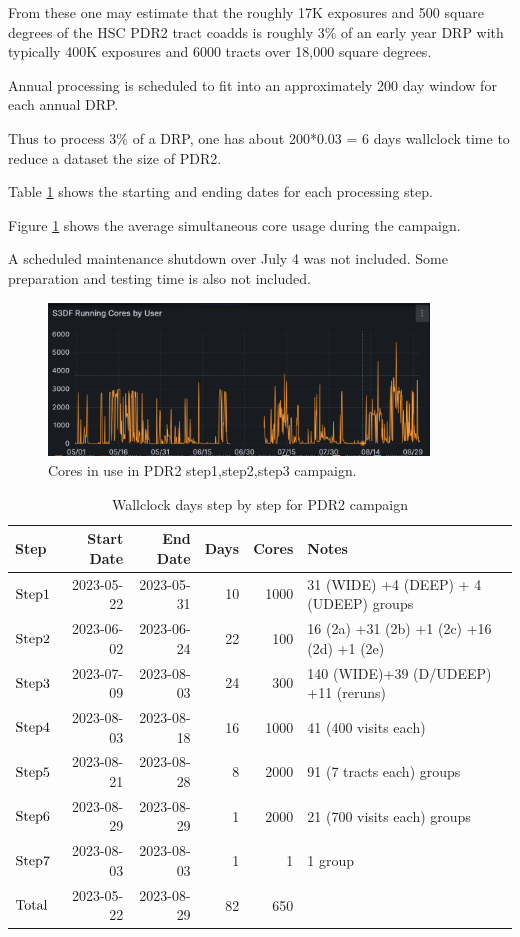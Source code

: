 From these one may estimate that the roughly 17K exposures and 500 
square degrees of the HSC PDR2 tract coadds is roughly 3\% of an 
early year DRP with typically 400K exposures and 6000 tracts 
over 18,000 square degrees.

Annual processing is scheduled to fit into an approximately 200 day window
for each annual DRP.

Thus to process 3\% of a DRP, one has about 200*0.03 = 6 days wallclock time
to reduce a dataset the size of PDR2.

Table \ref{tab:days} shows the 
starting and ending dates for each processing step.

Figure \ref{fig:cores} shows the average simultaneous core usage during the campaign.

A scheduled maintenance shutdown over July 4 was not included.  Some
preparation and testing time is also not included. 

\begin{figure}[hbt!]
\includegraphics[width=0.9\textwidth]{campaignCores.png}
\caption{Cores in use in PDR2 step1,step2,step3 campaign.}  \label{fig:cores}
\end{figure}

\normalsize
\begin{center}
\begin{longtable}{|l|r|r|r|r|l|}
\caption{Wallclock days step by step for PDR2 campaign} \label{tab:days}\\
\hline
\textbf{Step}&\textbf{Start Date}&\textbf{End Date}&\textbf{Days}&\textbf{Cores}&\textbf{Notes} \\
\hline
$\rm Step 1$ & 2023-05-22 & 2023-05-31 & 10 & 1000 & 31 (WIDE) +4 (DEEP) + 4 (UDEEP) groups \\
$\rm Step 2$ & 2023-06-02 & 2023-06-24 & 22 & 100 & 16 (2a) +31 (2b) +1 (2c) +16 (2d) +1 (2e) \\
$\rm Step 3$ & 2023-07-09 & 2023-08-03 & 24 & 300 &  140 (WIDE)+39 (D/UDEEP) +11 (reruns) \\
$\rm Step 4$ & 2023-08-03 & 2023-08-18 & 16 & 1000 &  41 (400 visits each)  \\
$\rm Step 5$ & 2023-08-21 & 2023-08-28 & 8 & 2000 & 91 (7 tracts each) groups \\
$\rm Step 6$ & 2023-08-29 & 2023-08-29 & 1 & 2000 & 21 (700 visits each) groups \\
$\rm Step 7$ & 2023-08-03 & 2023-08-03 & 1 & 1 & 1 group \\
\hline
$\rm Total$ & 2023-05-22 & 2023-08-29 & 82 & 650 &  \\
\hline
\end{longtable}
\end{center}
\normalsize

